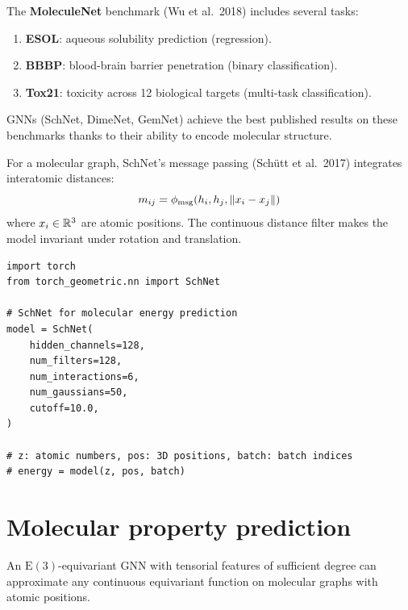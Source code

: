 \begin{example}
The \textbf{MoleculeNet} benchmark (Wu et al.\ 2018) includes
several tasks:
\begin{enumerate}
  \item \textbf{ESOL}: aqueous solubility prediction (regression).
  \item \textbf{BBBP}: blood-brain barrier penetration (binary
        classification).
  \item \textbf{Tox21}: toxicity across 12 biological targets
        (multi-task classification).
\end{enumerate}
GNNs (SchNet, DimeNet, GemNet) achieve the best published results on these benchmarks thanks to their
ability to encode molecular structure.
\end{example}

\begin{definition}
For a molecular graph, SchNet's message passing
(Sch\"utt et al.\ 2017) integrates interatomic
distances:
\[
  m_{ij} = \phi_{\mathrm{msg}}(h_i, h_j, \left\| x_i - x_j \right\|)
\]
where $x_i \in \mathbb{R}^3$ are atomic positions. The continuous distance
filter makes the model invariant under rotation and translation.
\end{definition}

\begin{verbatim}
import torch
from torch_geometric.nn import SchNet

# SchNet for molecular energy prediction
model = SchNet(
    hidden_channels=128,
    num_filters=128,
    num_interactions=6,
    num_gaussians=50,
    cutoff=10.0,
)

# z: atomic numbers, pos: 3D positions, batch: batch indices
# energy = model(z, pos, batch)
\end{verbatim}

\section{Molecular property prediction}
\label{sec:molecular_properties}

\begin{theorem}
An $\mathrm{E}(3)$-equivariant GNN with tensorial features of
sufficient degree can approximate any continuous equivariant
function on molecular graphs with atomic positions.
\end{theorem}

